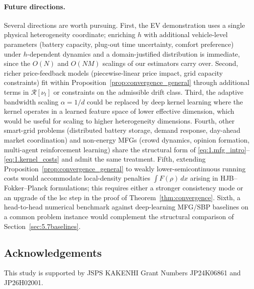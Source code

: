 \documentclass[11pt,leqno]{article}
\theoremstyle{plain}
\theoremstyle{remark}
\theoremstyle{definition}
\numberwithin{equation}{section}
\numberwithin{figure}{section}
\numberwithin{table}{section}
\numberwithin{algorithm}{section}
\begin{document}
\paragraph{Future directions.}
Several directions are worth pursuing.
First, the EV demonstration uses a single physical heterogeneity coordinate;
enriching $h$ with additional vehicle-level parameters
(battery capacity, plug-out time uncertainty, comfort preference)
under $h$-dependent dynamics and a domain-justified distribution is immediate,
since the $O(N)$ and $O(NM)$ scalings of our estimators carry over.
Second, richer price-feedback models (piecewise-linear price impact, grid capacity constraints)
fit within Proposition~\ref{prop:convergence_general}
through additional terms in $\mathcal{R}[\nu_t]$ or constraints on the admissible drift class.
Third, the adaptive bandwidth scaling $\alpha=1/d$ could be replaced by deep kernel learning
where the kernel operates in a learned feature space of lower effective dimension,
which would be useful for scaling to higher heterogeneity dimensions.
Fourth, other smart-grid problems (distributed battery storage, demand response, day-ahead market coordination)
and non-energy MFGs (crowd dynamics, opinion formation, multi-agent reinforcement learning)
share the structural form of \eqref{eq:1.mfg_intro}--\eqref{eq:1.kernel_costs}
and admit the same treatment.
Fifth, extending Proposition~\ref{prop:convergence_general} to weakly lower-semicontinuous running costs
would accommodate local-density penalties $\int F(\rho)\,dx$ arising in HJB--Fokker--Planck formulations;
this requires either a stronger consistency mode or an upgrade of the lsc step in the proof of Theorem~\ref{thm:convergence}.
Sixth, a head-to-head numerical benchmark against deep-learning MFG/SBP baselines
on a common problem instance would complement the structural comparison of Section~\ref{sec:5.7baselines}.


\subsection*{Acknowledgements}

This study is supported by JSPS KAKENHI Grant Numbers JP24K06861 and JP26H02001.




\end{document}
